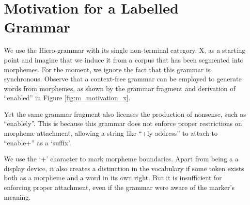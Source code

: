 \section{Motivation for a Labelled Grammar}
We use the Hiero-grammar with its single non-terminal category, X, as a starting point and imagine that we induce it from a corpus that has been segmented into morphemes.
For the moment, we ignore the fact that this grammar is synchronous.
Observe that a context-free grammar can be employed to generate words from morphemes, as shown by the grammar fragment and derivation of ``enabled'' in Figure \ref{fig:m_motivation_x}.

Yet the same grammar fragment also licenses the production of nonsense, such as ``enablely''.
This is because this grammar does not enforce proper restrictions on morpheme attachment, allowing a string like ``+ly address'' to attach to ``enable+'' as a `suffix'.

We use the `+' character to mark morpheme boundaries.
Apart from being a a display device, it also creates a distinction in the vocabulary if some token exists 
both as a morpheme and a word in its own right.
But it is insufficient for enforcing proper attachment, even if the grammar were aware of the marker's meaning.

